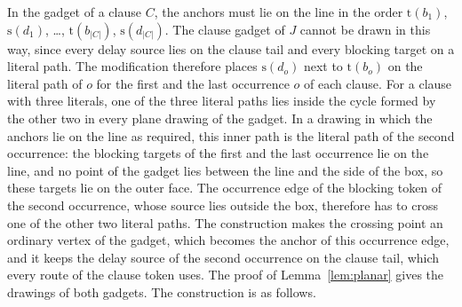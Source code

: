 \documentclass[a4paper,USenglish,thm-restate]{lipics-v2021}
\newcommand{\src}{\mathrm{s}}
\newcommand{\tgt}{\mathrm{t}}
\theoremstyle{problemstyle}
\begin{document}
In the gadget of a clause $C$, the anchors must lie on the line in the order
$\tgt(b_1)$, $\src(d_1)$, \ldots, $\tgt(b_{|C|})$, $\src(d_{|C|})$. The
clause gadget of
$J$ cannot be drawn in this way, since every delay source lies on the clause
tail and every blocking target on a literal path. The modification therefore
places $\src(d_o)$ next to $\tgt(b_o)$ on the literal path of $o$ for the
first and the last occurrence $o$ of each clause. For a clause with three
literals, one of the three literal paths lies inside the cycle formed by the
other two in every plane drawing of the gadget. In a drawing in which the
anchors lie on the line as required, this inner path is the literal path of
the second occurrence: the
blocking targets of the first and the last occurrence lie on the line, and
no point of the gadget lies between the line and the side of the box, so
these targets lie on the outer face. The occurrence edge of the blocking
token of the second occurrence, whose source lies outside the box,
therefore has to cross one of the other two literal paths. The construction
makes the crossing point an ordinary vertex of the gadget, which becomes the
anchor of this occurrence edge, and it keeps the delay source of the second
occurrence on the clause tail, which every route of the clause token uses.
The proof of Lemma~\ref{lem:planar} gives the drawings of both gadgets. The
construction is as follows.
\end{document}
